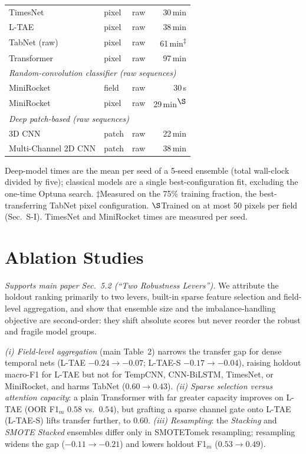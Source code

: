 \documentclass[preprint,authoryear,3p]{elsarticle}
\begin{document}
\begin{table}[!t]
\begin{tabular}{lllr}
TimesNet               & pixel & raw & 30\,min \\
L-TAE                  & pixel & raw & 38\,min \\
TabNet (raw)           & pixel & raw & 61\,min\textsuperscript{$\ddagger$} \\
Transformer            & pixel & raw & 97\,min \\
\midrule
\multicolumn{4}{l}{\emph{Random-convolution classifier (raw sequences)}}\\
MiniRocket             & field & raw & 30\,s \\
MiniRocket             & pixel & raw & 29\,min\textsuperscript{$\S$} \\
\midrule
\multicolumn{4}{l}{\emph{Deep patch-based (raw sequences)}}\\
3D CNN                 & patch & raw & 22\,min \\
Multi-Channel 2D CNN   & patch & raw & 38\,min \\
\bottomrule
\end{tabular}
\par\vspace{3pt}
\begin{minipage}{\linewidth}
\footnotesize
Deep-model times are the mean per seed of a 5-seed ensemble (total wall-clock divided by five);
classical models are a single best-configuration fit, excluding the one-time Optuna search.
$\ddagger$Measured on the 75\% training fraction, the best-transferring TabNet pixel configuration. $\S$Trained on at most 50 pixels per field (Sec.~S-I). TimesNet and MiniRocket times are measured per seed.
\end{minipage}
\end{table}

\section{Ablation Studies}
\label{sec:ablation}
\emph{Supports main paper Sec.~5.2 (``Two Robustness Levers'').}
We attribute the holdout ranking primarily to two levers, built-in sparse feature selection and
field-level aggregation, and show that ensemble size and the imbalance-handling objective are
second-order: they shift absolute scores but never reorder the robust and fragile model groups.

\emph{(i) Field-level aggregation} (main Table~2) narrows the transfer gap for dense temporal nets
(L-TAE $-0.24\rightarrow-0.07$; L-TAE-S $-0.17\rightarrow-0.04$), raising holdout macro-F1 for L-TAE but
not for TempCNN, CNN-BiLSTM, TimesNet, or MiniRocket, and harms TabNet
($0.60\rightarrow0.43$). \emph{(ii) Sparse selection versus attention capacity}: a plain Transformer
with far greater capacity improves on L-TAE (OOR F1$_m$ $0.58$ vs.\ $0.54$), but grafting a sparse
channel gate onto L-TAE (L-TAE-S) lifts transfer further, to $0.60$. \emph{(iii) Resampling}: the \emph{Stacking}
and \emph{SMOTE Stacked} ensembles differ only in SMOTETomek resampling; resampling widens the gap
($-0.11\rightarrow-0.21$) and lowers holdout F1$_m$ ($0.53\rightarrow0.49$).
\end{document}
